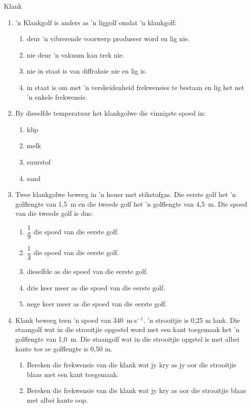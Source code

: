 \begin{eocexercises}{Klank}
\begin{enumerate}[noitemsep, label=\textbf{\arabic*}. ]
\item 'n Klankgolf is anders as 'n liggolf omdat 'n klankgolf:
\begin{enumerate}[noitemsep, label=\textbf{\alph*}. ] 
    \item deur 'n vibrerende voorwerp produseer word en lig nie.
    \item nie deur 'n vakuum kan trek nie.
    \item nie in staat is van diffraksie nie en lig is.
    \item in staat is om met 'n verskeidenheid frekwensies te bestaan en lig het net 'n enkele frekwensie. 
\end{enumerate}

\item By dieselfde temperatuur het klankgolwe die vinnigste spoed in:
\begin{enumerate}[noitemsep, label=\textbf{\alph*}. ] 
    \item klip
    \item melk
    \item suurstof
    \item sand
\end{enumerate}
                
\item Twee klankgolwe beweeg in 'n houer met stikstofgas. Die eerste golf het 'n golflengte van 1,5~m en die tweede golf het 'n golflengte van 4,5~m. Die spoed van die tweede golf is dus:
\begin{enumerate}[itemsep=5pt, label=\textbf{\alph*}. ] 
    \item $\dfrac{1}{9}$ die spoed van die eerste golf.
    \item $\dfrac{1}{3}$ die spoed van die eerste golf.
    \item dieselfde as die spoed van die eerste golf.
    \item drie keer meer as die spoed van die eerste golf.
    \item nege keer meer as die spoed van die eerste golf.
\end{enumerate}


\item Klank beweeg teen 'n spoed van 340~m$\ensuremath{\cdot}$s${}^{-1}$. 'n strooitjie is 0,25 m lank. Die staangolf wat in die strooitjie opgestel word met een kant toegemaak het 'n golflengte van 1,0~m. Die staangolf wat in die strooitjie opgstel is met albei kante toe se golflengte is 0,50 m.
\begin{enumerate}[noitemsep, label=\textbf{\alph*}. ] 
    \item Bereken die frekwensie van die klank wat jy kry as jy oor die strooitjie blaas met een kant toegemaak.
    \item Bereken die frekwensie van die klank wat jy kry as oor die strooitjie blaas met albei kante oop.
\end{enumerate}


\end{enumerate}
\end{eocexercises}
